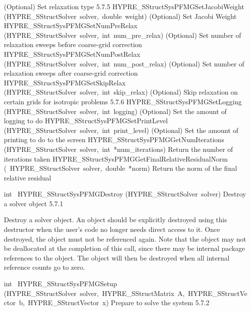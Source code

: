 \documentclass{article}
\begin{document}
\begin{cxxentry}
\begin{cxxentry}
\begin{cxxnames}
{(Optional) Set relaxation type}
        {5.7.5}
        {HYPRE\_SStructSysPFMGSetJacobiWeight}
        {(HYPRE\_SStructSolver\ solver,\ double\ weight)}
        {
(Optional) Set Jacobi Weight}
        {}
\label{cxx.5.7.12}
        {HYPRE\_SStructSysPFMGSetNumPreRelax}
        {(HYPRE\_SStructSolver\ solver,\ int\ num\_pre\_relax)}
        {
(Optional) Set number of relaxation sweeps before coarse-grid correction}
        {}
\label{cxx.5.7.13}
        {HYPRE\_SStructSysPFMGSetNumPostRelax}
        {(HYPRE\_SStructSolver\ solver,\ int\ num\_post\_relax)}
        {
(Optional) Set number of relaxation sweeps after coarse-grid correction}
        {}
\label{cxx.5.7.14}
        {HYPRE\_SStructSysPFMGSetSkipRelax}
        {(HYPRE\_SStructSolver\ solver,\ int\ skip\_relax)}
        {
(Optional) Skip relaxation on certain grids for isotropic problems}
        {5.7.6}
        {HYPRE\_SStructSysPFMGSetLogging}
        {(HYPRE\_SStructSolver\ solver,\ int\ logging)}
        {
(Optional) Set the amount of logging to do}
        {}
\label{cxx.5.7.15}
        {HYPRE\_SStructSysPFMGSetPrintLevel}
        {(HYPRE\_SStructSolver\ solver,\ int\ print\_level)}
        {
(Optional) Set the amount of printing to do to the screen}
        {}
\label{cxx.5.7.16}
        {HYPRE\_SStructSysPFMGGetNumIterations}
        {(HYPRE\_SStructSolver\ solver,\ int\ *num\_iterations)}
        {
Return the number of iterations taken}
        {}
\label{cxx.5.7.17}
        {HYPRE\_SStructSysPFMGGetFinalRelativeResidualNorm}
        {(\ HYPRE\_SStructSolver\ solver,\ double\ *norm)}
        {
Return the norm of the final relative residual}
        {}
\label{cxx.5.7.18}
\end{cxxnames}
\begin{cxxfunction}
{int\ }
        {HYPRE\_SStructSysPFMGDestroy}
        {(HYPRE\_SStructSolver\ solver)}
        {
Destroy a solver object}
        {5.7.1}
\begin{cxxdoc}

Destroy a solver object.  An object should be explicitly destroyed
using this destructor when the user's code no longer needs direct
access to it.  Once destroyed, the object must not be referenced
again.  Note that the object may not be deallocated at the
completion of this call, since there may be internal package
references to the object.  The object will then be destroyed when
all internal reference counts go to zero.
\end{cxxdoc}
\end{cxxfunction}
\begin{cxxfunction}
{int\ }
        {HYPRE\_SStructSysPFMGSetup}
        {(HYPRE\_SStructSolver\ solver,\ HYPRE\_SStructMatrix\ A,\ HYPRE\_SStructVector\ b,\ HYPRE\_SStructVector\ x)}
        {
Prepare to solve the system}
        {5.7.2}
\begin{cxxdoc}


\end{cxxdoc}
\end{cxxfunction}
\end{cxxentry}
\end{cxxentry}
\end{document}
